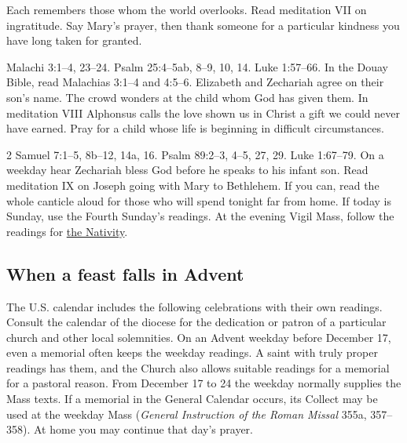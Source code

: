 \begin{description}
Each remembers those whom the world overlooks. Read meditation VII on
ingratitude. Say Mary's prayer, then thank someone for a particular
kindness you have long taken for granted.
\item[December 23 (199)] Malachi 3:1--4, 23--24. Psalm 25:4--5ab,
8--9, 10, 14. Luke 1:57--66. In the Douay Bible, read Malachias
3:1--4 and 4:5--6. Elizabeth and Zechariah agree on their
son's name. The crowd wonders at the child whom God has given them.
In meditation VIII Alphonsus calls the love shown us in Christ a gift
we could never have earned. Pray for a child whose life is beginning
in difficult circumstances.
\item[December 24, morning (200)] 2 Samuel 7:1--5, 8b--12, 14a, 16.
Psalm 89:2--3, 4--5, 27, 29. Luke 1:67--79. On a weekday hear
Zechariah bless God before he speaks to his infant son. Read meditation
IX on Joseph going with Mary to Bethlehem. If you can, read the whole
canticle aloud for those who will spend tonight far from home. If today
is Sunday, use the Fourth Sunday's readings. At the evening Vigil Mass,
follow the readings for \hyperref[sec:pc-christmas]{the Nativity}.
\end{description}

\subsection{When a feast falls in Advent}
\label{sec:pc-advent-feasts}

The U.S. calendar includes the following celebrations with their own
readings. Consult the calendar of the diocese for the dedication or
patron of a particular church and other local solemnities. On an Advent
weekday before December 17, even a memorial often keeps the weekday
readings. A saint with truly proper readings has them, and the Church
also allows suitable readings for a memorial for a pastoral reason.
From December 17 to 24 the weekday normally supplies the Mass texts.
If a memorial in the General Calendar occurs, its Collect may be used
at the weekday Mass (\emph{General Instruction of the Roman Missal}
355a, 357--358). At home you may continue that day's prayer.

